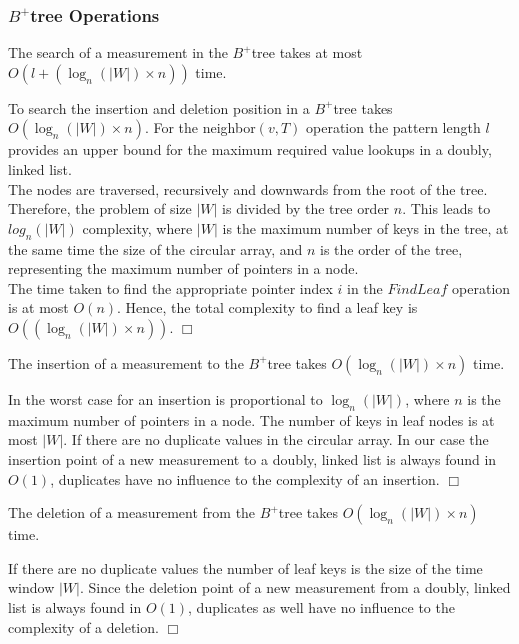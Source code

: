 \documentclass[abstracton,12pt]{scrreprt}
\newenvironment{proof}
  {\noindent{\bf Proof:\rm}}{\hfill$\Box$\vspace{\medskipamount}}
\begin{document}
\subsubsection{$B^+$tree Operations}
\begin{mydef}
	The search of a measurement in the $B^+$tree takes at most $O(l + (\log_{n}(|W|) \times n))$ time.
	\label{def1}
\end{mydef}
\begin{proof}
	To search the insertion and deletion position in a $B^+$tree takes $O(\log_{n}(|W|) \times n)$. For the neighbor$(v,T)$ operation the pattern length $l$ provides an upper bound for the maximum required value lookups in a doubly, linked list.\\ The nodes are traversed, recursively and downwards from the root of the tree. Therefore, the problem of size $|W|$ is divided by the tree order $n$. This leads to $log_n(|W|)$ complexity, where $|W|$ is the maximum number of keys in the tree, at the same time the size of the circular array, and $n$ is the order of the tree, representing the maximum number of pointers in a node. \\The time taken to find the appropriate pointer index $i$ in the $FindLeaf$ operation is at most $O(n)$. Hence, the total complexity to find a leaf key is $O((\log_{n}(|W|) \times n))$. 
\end{proof}

\begin{mydef}
	The insertion of a measurement to the $B^+$tree takes $O(\log_{n}(|W|) \times n)$ time.
\end{mydef}
\begin{proof}
	In the worst case for an insertion is proportional to $\log_{n}(|W|)$, where $n$ is the maximum number of pointers in a node. The number of keys in leaf nodes is at most $|W|$. If there are no duplicate values in the circular array. In our case the insertion point of a new measurement to a doubly, linked list is always found in $O(1)$, duplicates have no influence to the complexity of an insertion.  
\end{proof}
\begin{mydef}
	The deletion of a measurement from the $B^+$tree takes $O(\log_{n}(|W|) \times n)$ time.
\end{mydef}
\begin{proof}
	 If there are no duplicate values the number of leaf keys is the size of the time window $|W|$. Since the deletion point of a new measurement from a doubly, linked list is always found in $O(1)$, duplicates as well have no influence to the complexity of a deletion. 
\end{proof}
\end{document}
